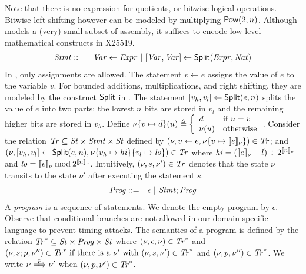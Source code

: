 Note that there is no expression for quotients, or bitwise logical
operations. Bitwise left shifting however can be modeled by
multiplying $\mbox{\textsf{Pow}}(2, n)$. Although \mydsl models a (very) 
small subset of assembly, it suffices to encode low-level
mathematical constructs in X25519.
\begin{eqnarray*}
  \mathit{Stmt} & ::= & \mathit{Var} \leftarrow \mathit{Expr}
            \ |\  {[}{\mathit{Var}}, {\mathit{Var}}{]} \leftarrow \mbox{\textsf{Split}} (\mathit{Expr}, \mathit{Nat})
\end{eqnarray*}
In \mydsl, only assignments are allowed.
The statement $v \leftarrow e$ assigns the value of $e$
to the variable $v$. For bounded additions, multiplications, and right
shifting, they are modeled by the construct $\mbox{\textsf{Split}}$ in \mydsl.
The statement ${[}{v_h}, {v_l}{]} \leftarrow
\mbox{\textsf{Split}}(e, n)$ splits the value of $e$ into two parts;
the lowest $n$ bits are stored in $v_l$ and the remaining higher bits
are stored in $v_h$. Define
$
\nu\{{v} \mapsto {d}\}(u) \triangleq
\left\{
   \begin{array}{ll}
     d & \textmd{if $u = v$}\\
     \nu(u) & \textmd{otherwise}
   \end{array}
\right.
$.
Consider the relation $\mathit{Tr} \subseteq \mathit{St} \times \mathit{Stmt} \times \mathit{St}$ defined
by $(\nu, v \leftarrow e, \nu\{{v} \mapsto {[\![{e}]\!]_{\nu}}\}) \in \mathit{Tr}$; and
  $(\nu, {[}{v_h}, {v_l}{]} \leftarrow \mbox{\textsf{Split}} (e, n), 
  \nu\{{v_h} \mapsto {\mathit{hi}}\}\{{v_l} \mapsto {\mathit{lo}}\}) \in \mathit{Tr}$
where
$\mathit{hi} = ([\![{e}]\!]_{\nu} - l) \div 2^{[\![{n}]\!]_{\nu}}$ and
$\mathit{lo} = [\![{e}]\!]_{\nu} \mathbin{\textmd{mod}} 2^{[\![{n}]\!]_{\nu}}$.
Intuitively, $(\nu, s, \nu') \in \mathit{Tr}$ denotes that the state $\nu$ transits to 
the state $\nu'$ after executing the statement $s$.
\begin{eqnarray*}
  \mathit{Prog} & ::= & \epsilon \ |\ \mathit{Stmt}; \mathit{Prog}
\end{eqnarray*}
A \emph{program} is a sequence of statements. We denote the empty program by 
$\epsilon$. Observe that conditional branches are not allowed in our
domain specific language to prevent timing attacks. The semantics of a
program is defined by the relation 
$\mathit{Tr}^* \subseteq \mathit{St} \times \mathit{Prog} \times \mathit{St}$ where
$(\nu, \epsilon, \nu) \in \mathit{Tr}^*$ and
$(\nu, s; p, \nu'') \in \mathit{Tr}^* \textmd{ if }
    \textmd{there is a } \nu' \textmd{ with }
    (\nu, s, \nu') \in \mathit{Tr}^*$ and
    $(\nu, p, \nu'') \in \mathit{Tr}^*$.
We write $\nu \overset{p}{\Longrightarrow} \nu'$ when $(\nu, p, \nu') \in \mathit{Tr}^*$.


